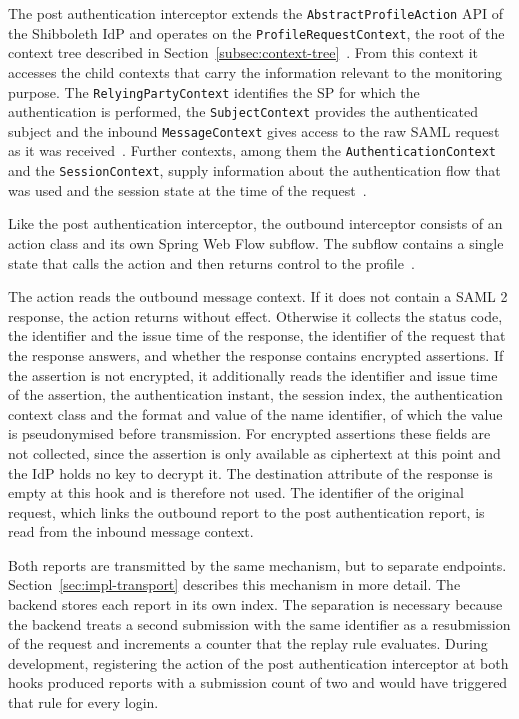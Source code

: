 \documentclass[../main.tex]{subfiles}
\begin{document}
The post authentication interceptor extends the \texttt{Abstract\allowbreak{}Profile\allowbreak{}Action} 
API of the Shibboleth IdP and operates on the \texttt{Profile\allowbreak{}Request\allowbreak{}Context}, 
the root of the context tree described in Section~\ref{subsec:context-tree}~\cite{AbstractProfileAction, ProfileRequestContext}. 
From this context it accesses the child contexts that carry the information relevant to 
the monitoring purpose. 
The \texttt{Relying\allowbreak{}Party\allowbreak{}Context} identifies the SP for which the authentication is 
performed, the \texttt{Subject\allowbreak{}Context} provides the authenticated subject and the 
inbound \texttt{Message\allowbreak{}Context} gives access to the raw SAML request as it was 
received~\cite{RelyingPartyContext, SubjectContext, InOutOperationContext}. 
Further contexts, among them the \texttt{Authentication\allowbreak{}Context} and the 
\texttt{SessionContext}, supply information about the authentication flow that was used 
and the session state at the time of the request~\cite{AuthenticationContext, SessionContext}. 

Like the post authentication interceptor, the outbound interceptor consists of an action class and 
its own Spring Web Flow subflow. 
The subflow contains a single state that calls the action and then returns control to the 
profile~\cite{ProfileInterceptConfiguration}. 
 
The action reads the outbound message context. 
If it does not contain a SAML 2 response, the action returns without effect. 
Otherwise it collects the status code, the identifier and the issue time of the response, the 
identifier of the request that the response answers, and whether the response contains encrypted 
assertions. 
If the assertion is not encrypted, it additionally reads the identifier and issue time of the 
assertion, the authentication instant, the session index, the authentication context class and the 
format and value of the name identifier, of which the value is pseudonymised before transmission. 
For encrypted assertions these fields are not collected, since the assertion is only available as 
ciphertext at this point and the IdP holds no key to decrypt it. 
The destination attribute of the response is empty at this hook and is therefore not used. 
The identifier of the original request, which links the outbound report to the post authentication report, 
is read from the inbound message context. 

Both reports are transmitted by the same mechanism, but to separate endpoints. 
Section~\ref{sec:impl-transport} describes this mechanism in more detail. 
The backend stores each report in its own index. 
The separation is necessary because the backend treats a second submission with the same identifier 
as a resubmission of the request and increments a counter that the replay rule evaluates. 
During development, registering the action of the post authentication interceptor at both hooks produced 
reports with a submission count of two and would have triggered that rule for every login. 
 
\end{document}
